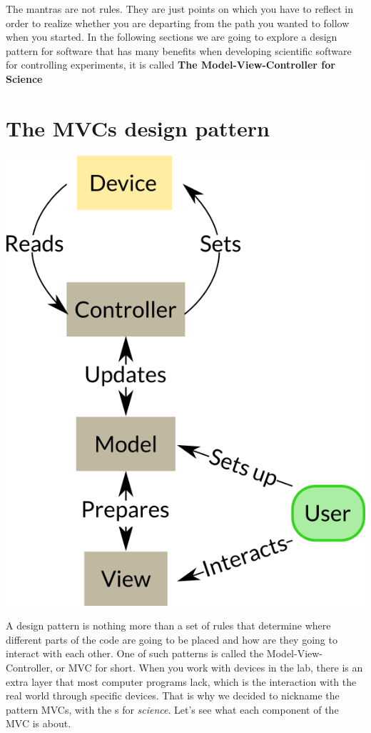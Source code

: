 The mantras are not rules. They are just points on which you have to reflect in order to realize whether you are departing from the path you wanted to follow when you started. In the following sections we are going to explore a design pattern for software that has many benefits when developing scientific software for controlling experiments, it is called \textbf{The Model-View-Controller for Science}

\section{The MVCs design pattern}\label{section:MVC}
\begin{center}
\includegraphics{images/Chapter_04/MVCs.png}
\end{center}

A design pattern is nothing more than a set of rules that determine where different parts of the code are going to be placed and how are they going to interact with each other. One of such patterns is called the Model-View-Controller, or MVC for short. When you work with devices in the lab, there is an extra layer that most computer programs lack, which is the interaction with the real world through specific devices. That is why we decided to nickname the pattern MVCs, with the s for \emph{science}. Let's see what each component of the MVC is about. 

